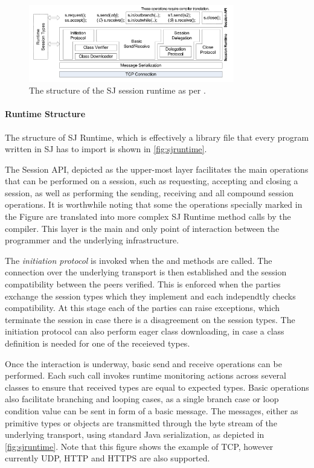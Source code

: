 \begin{figure}[htb]
\begin{center}
\includegraphics[width=0.8\textwidth]{sjruntime.png}
\caption{The structure of the SJ session runtime as per \cite{sessionbased_programming}.}
\label{fig:sjruntime}
\end{center}
\end{figure}

\paragraph*{Runtime Structure}
The structure of SJ Runtime, which is effectively a  library file that every program written in SJ has to import is shown in \autoref{fig:sjruntime}.

The Session API, depicted as the upper-most layer facilitates the main operations that can be performed on a session, such as requesting, accepting and closing a session, as well as performing the sending, receiving and all compound session operations. It is worthwhile noting that some the operations specially marked in the Figure are translated into more complex SJ Runtime method calls by the compiler. This layer is the main and only point of interaction between the programmer and the underlying infrastructure.

The \textit{initiation protocol} is invoked when the  and  methods are called. The connection over the underlying transport is then established and the session compatibility between the peers verified. This is enforced when the parties exchange the session types which they implement and each independtly checks compatibility. At this stage each of the parties can raise exceptions, which terminate the session in case there is a disagreement on the session types. The initiation protocol can also perform eager class downloading, in case a class definition is needed for one of the receieved types.

Once the interaction is underway, basic send and receive operations can be performed. Each such call invokes runtime monitoring actions across several classes to ensure that received types are equal to expected types. Basic operations also facilitate branching and looping cases, as a single branch case or loop condition value can be sent in form of a basic message. The messages, either as primitive types or objects are transmitted through the byte stream of the underlying transport, using standard Java serialization, as depicted in \autoref{fig:sjruntime}. Note that this figure shows the example of TCP, however currently UDP, HTTP and HTTPS are also supported.

